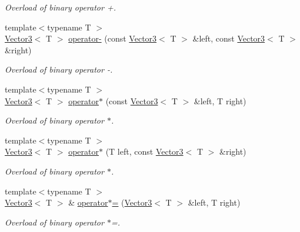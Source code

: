 \begin{DoxyCompactItemize}
\begin{DoxyCompactList}\small\item\em Overload of binary operator +. \end{DoxyCompactList}\item 
{\footnotesize template$<$typename T $>$ }\\\hyperlink{class_triton_1_1_util_1_1_vector3}{Vector3}$<$ T $>$ \hyperlink{class_triton_1_1_util_1_1_vector3_abe0b9411c00cf807bf8a5f835874bd2a}{operator-\/} (const \hyperlink{class_triton_1_1_util_1_1_vector3}{Vector3}$<$ T $>$ \&left, const \hyperlink{class_triton_1_1_util_1_1_vector3}{Vector3}$<$ T $>$ \&right)
\begin{DoxyCompactList}\small\item\em Overload of binary operator -\/. \end{DoxyCompactList}\item 
{\footnotesize template$<$typename T $>$ }\\\hyperlink{class_triton_1_1_util_1_1_vector3}{Vector3}$<$ T $>$ \hyperlink{class_triton_1_1_util_1_1_vector3_a44ec312b31c1a85dcff4863795f98329}{operator$\ast$} (const \hyperlink{class_triton_1_1_util_1_1_vector3}{Vector3}$<$ T $>$ \&left, T right)
\begin{DoxyCompactList}\small\item\em Overload of binary operator $\ast$. \end{DoxyCompactList}\item 
{\footnotesize template$<$typename T $>$ }\\\hyperlink{class_triton_1_1_util_1_1_vector3}{Vector3}$<$ T $>$ \hyperlink{class_triton_1_1_util_1_1_vector3_aa6f2b0d9f79c1b9774759b7087affbb1}{operator$\ast$} (T left, const \hyperlink{class_triton_1_1_util_1_1_vector3}{Vector3}$<$ T $>$ \&right)
\begin{DoxyCompactList}\small\item\em Overload of binary operator $\ast$. \end{DoxyCompactList}\item 
{\footnotesize template$<$typename T $>$ }\\\hyperlink{class_triton_1_1_util_1_1_vector3}{Vector3}$<$ T $>$ \& \hyperlink{class_triton_1_1_util_1_1_vector3_ad5fb972775ce8ab58cd9670789e806a7}{operator$\ast$=} (\hyperlink{class_triton_1_1_util_1_1_vector3}{Vector3}$<$ T $>$ \&left, T right)
\begin{DoxyCompactList}\small\item\em Overload of binary operator $\ast$=. \end{DoxyCompactList}\item 

\end{DoxyCompactItemize}
